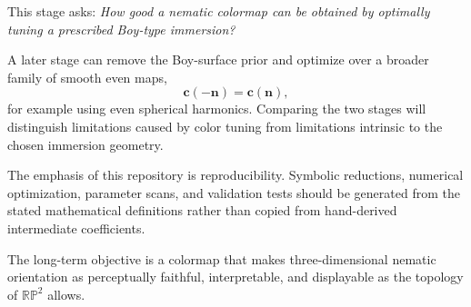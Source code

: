 \documentclass[11pt]{article}
\newcommand{\RP}{\mathbb{RP}}
\newcommand{\vect}[1]{\mathbf{#1}}
\begin{document}
This stage asks: \emph{How good a nematic colormap can be obtained by optimally tuning a prescribed Boy-type immersion?}

A later stage can remove the Boy-surface prior and optimize over a broader family of smooth even maps,
\[
\vect c(-\vect n)=\vect c(\vect n),
\]
for example using even spherical harmonics. Comparing the two stages will distinguish limitations caused by color tuning from limitations intrinsic to the chosen immersion geometry.

The emphasis of this repository is reproducibility. Symbolic reductions, numerical optimization, parameter scans, and validation tests should be generated from the stated mathematical definitions rather than copied from hand-derived intermediate coefficients.

The long-term objective is a colormap that makes three-dimensional nematic orientation as perceptually faithful, interpretable, and displayable as the topology of $\RP^2$ allows.
\end{document}
